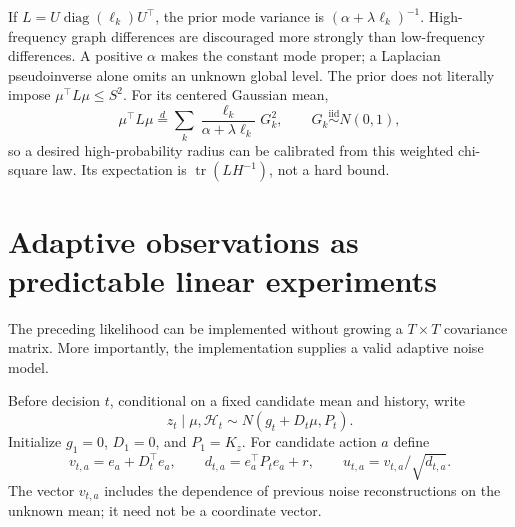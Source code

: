 \documentclass[11pt]{article}
\begin{document}
If $L=U\operatorname{diag}(\ell_k)U^\top$, the prior mode variance is $(\alpha+\lambda\ell_k)^{-1}$. High-frequency graph differences are discouraged more strongly than low-frequency differences. A positive $\alpha$ makes the constant mode proper; a Laplacian pseudoinverse alone omits an unknown global level. The prior does not literally impose $\mu^\top L\mu\le S^2$. For its centered Gaussian mean,
\begin{equation}
\mu^\top L\mu\overset{d}=\sum_k
\frac{\ell_k}{\alpha+\lambda\ell_k}G_k^2,
\qquad G_k\stackrel{\mathrm{iid}}\sim N(0,1),
\label{eq:energy-law}
\end{equation}
so a desired high-probability radius can be calibrated from this weighted chi-square law. Its expectation is $\operatorname{tr}(LH^{-1})$, not a hard bound.

\section{Adaptive observations as predictable linear experiments}
The preceding likelihood can be implemented without growing a $T\times T$ covariance matrix. More importantly, the implementation supplies a valid adaptive noise model.

Before decision $t$, conditional on a fixed candidate mean and history, write
\begin{equation}
z_t\mid\mu,\mathcal H_t\sim N(g_t+D_t\mu,P_t).
\label{eq:affine-filter}
\end{equation}
Initialize $g_1=0$, $D_1=0$, and $P_1=K_z$. For candidate action $a$ define
\begin{equation}
v_{t,a}=e_a+D_t^\top e_a,\qquad
d_{t,a}=e_a^\top P_te_a+r,\qquad
u_{t,a}=v_{t,a}/\sqrt{d_{t,a}}.
\label{eq:adaptive-vector}
\end{equation}
The vector $v_{t,a}$ includes the dependence of previous noise reconstructions on the unknown mean; it need not be a coordinate vector.
\end{document}
